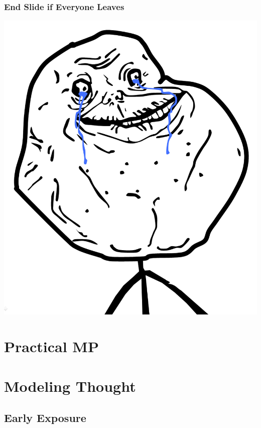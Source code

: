 \documentclass[slidestop,compress,mathserif]{beamer}
\begin{document}
\begin{frame}
	\frametitle{End Slide if Everyone Leaves}
	\begin{center}
		\includegraphics[scale=0.25]{img/forever_alone.png}
	\end{center}
\end{frame}


\section{Practical MP} %
\label{sub:practical_metaprogramming}

\section{Modeling Thought} %
\label{sec:modeling_thought}

\subsection{Early Exposure} %
\label{sub:early_exposure}
\end{document}
